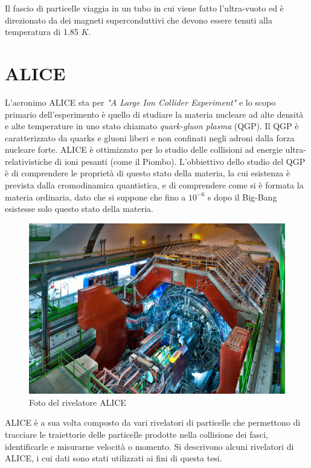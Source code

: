 Il fascio di particelle viaggia in un tubo in cui viene fatto l'ultra-vuoto ed è direzionato da dei magneti superconduttivi che devono essere tenuti alla temperatura di 1.85 $K$.

\section{ALICE}

L'acronimo ALICE sta per \textit{"A Large Ion Collider Experiment"} e lo  scopo primario dell'esperimento è quello di studiare la materia nucleare ad alte densità e alte temperature in uno stato chiamato \textit{quark-gluon plasma} (QGP). Il QGP è caratterizzato da quarks e gluoni liberi e non confinati negli adroni dalla forza nucleare forte. ALICE è ottimizzato per lo studio delle collisioni ad energie ultra-relativistiche di ioni pesanti (come il Piombo). L'obbiettivo dello studio del QGP è di comprendere le proprietà di questo stato della materia, la cui esistenza è prevista dalla cromodinamica quantistica, e di comprendere come si è formata la materia ordinaria, dato che si suppone che fino a $10^{-6}$ s dopo il Big-Bang esistesse solo questo stato della materia.  
    
    \begin{figure}[htbp]
        \centering
        \includegraphics[width=0.6\linewidth]{ALICE/ALICE_LRsaba_CERN_0212_3219.jpg}
        \caption{Foto del rivelatore ALICE}
        \label{fig:ALICEcomplex}
    \end{figure}
    
ALICE \cite{Collaboration_2008_ALICE} è a sua volta composto da vari rivelatori di particelle che permettono di tracciare le traiettorie delle particelle prodotte nella collisione dei fasci, identificarle e misurarne velocità o momento. Si descrivono alcuni rivelatori di ALICE, i cui dati sono stati utilizzati ai fini di questa tesi.

